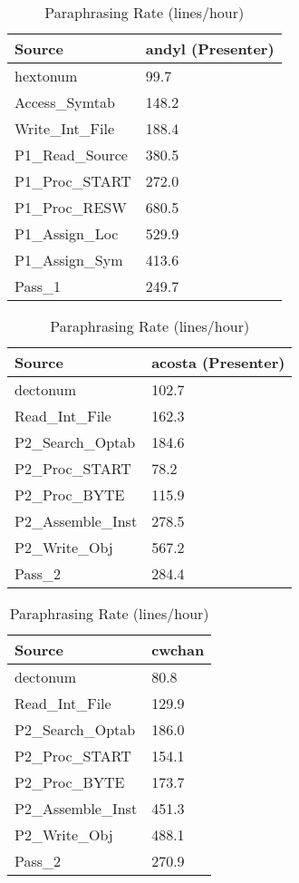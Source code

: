 \begin{table}[hb]
\begin{center}
\begin{tabular}{|l|l|}
\hline
Source & andyl (Presenter)\\
\hline
hextonum & 99.7\\
Access\_Symtab & 148.2\\
Write\_Int\_File & 188.4\\
P1\_Read\_Source & 380.5\\
P1\_Proc\_START & 272.0\\
P1\_Proc\_RESW & 680.5\\
P1\_Assign\_Loc & 529.9\\
P1\_Assign\_Sym & 413.6\\
Pass\_1 & 249.7\\
\hline
\end{tabular}
\end{center}
\caption{Paraphrasing Rate (lines/hour)}
\end{table}

\begin{table}[hb]
\begin{center}
\begin{tabular}{|l|l|}
\hline
Source & acosta (Presenter)\\
\hline
dectonum & 102.7\\
Read\_Int\_File & 162.3\\
P2\_Search\_Optab & 184.6\\
P2\_Proc\_START & 78.2\\
P2\_Proc\_BYTE & 115.9\\
P2\_Assemble\_Inst & 278.5\\
P2\_Write\_Obj & 567.2\\
Pass\_2 & 284.4\\
\hline
\end{tabular}
\end{center}
\caption{Paraphrasing Rate (lines/hour)}
\end{table}

\begin{table}[hb]
\begin{center}
\begin{tabular}{|l|l|}
\hline
Source & cwchan\\
\hline
dectonum & 80.8\\
Read\_Int\_File & 129.9\\
P2\_Search\_Optab & 186.0\\
P2\_Proc\_START & 154.1\\
P2\_Proc\_BYTE & 173.7\\
P2\_Assemble\_Inst & 451.3\\
P2\_Write\_Obj & 488.1\\
Pass\_2 & 270.9\\
\hline
\end{tabular}
\end{center}
\caption{Paraphrasing Rate (lines/hour)}
\end{table}



